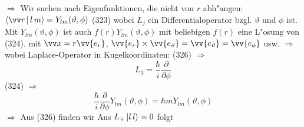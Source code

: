 \documentclass[a4paper]{scrartcl}
\begin{document}
{$\Longrightarrow$ Wir suchen nach Eigenfunktionen, die nicht von $r$ abh"angen: $\Braket{ \vv r | l \, m } = Y_{lm} ( \vartheta, \phi)$ \hfill (323)
\setcounter{equation}{323}
wobei $L_j$ ein Differentialoperator bzgl. $\vartheta$ und $\phi$ ist. Mit $Y_{lm}( \vartheta, \phi)$ ist auch $f(r) Y_{lm}( \vartheta, \phi)$ mit beliebigen $f(r)$ eine L"osung von (324).
mit $\vv x = r \vv{e_r}$, $\vv {e_r} \times \vv {e_\vartheta} = \vv{ e_\vartheta} = \vv{e_\phi}$ usw.
$\Longrightarrow$
wobei 
Laplace-Operator in Kugelkoordinaten:
(326) $\Longrightarrow$
$$L_3 = \frac \hbar i \frac \partial {\partial \phi}$$
(324) $\Longrightarrow$ 
$$\frac \hbar i \frac \partial {\partial \phi} Y_{lm}(\vartheta, \phi) = \hbar m Y_{lm} ( \vartheta, \phi)$$
$\Longrightarrow$
Aus (326) finden wir
Aus $L_+ \Ket{ l  \, l } = 0$ folgt
}
\end{document}
